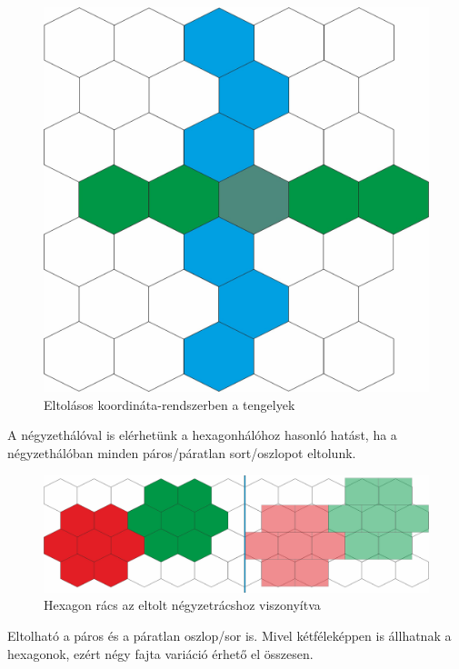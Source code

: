 \begin{figure}[h!]
\centering
\includegraphics[scale=0.2]{kepek/OffsetCoord.jpg}
\caption{Eltolásos koordináta-rendszerben a tengelyek}
\label{fig:OffsetCoord}
\end{figure}

\noindent A négyzethálóval is elérhetünk a hexagonhálóhoz hasonló hatást, ha a négyzethálóban minden páros/páratlan sort/oszlopot eltolunk.

\begin{figure}[h!]
\centering
\includegraphics[scale=0.25]{kepek/Hex_Sq.jpg}
\caption{Hexagon rács az eltolt négyzetrácshoz viszonyítva}
\label{fig:Hex_Sq}
\end{figure}

\noindent Eltolható a páros és a páratlan oszlop/sor is. Mivel kétféleképpen is állhatnak a hexagonok, ezért négy fajta variáció érhető el összesen.

